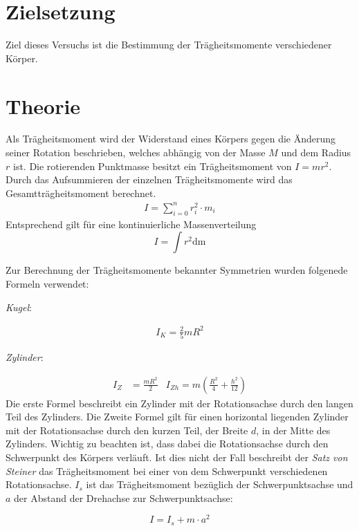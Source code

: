 \section{Zielsetzung}
Ziel dieses Versuchs ist die Bestimmung der Trägheitsmomente verschiedener Körper.
\section{Theorie}

Als Trägheitsmoment wird der Widerstand eines Körpers gegen die Änderung seiner Rotation beschrieben,
welches abhängig von der Masse $M$ und dem Radius $r$ ist.
Die rotierenden Punktmasse besitzt ein Trägheitsmoment von $I = mr^2$.
Durch das Aufsummieren der einzelnen Trägheitsmomente wird das Gesamtträgheitsmoment berechnet.
\begin{align}
 I= \sum_{i = 0}^n r_i^2\cdot m_i
 \end{align}
 Entsprechend gilt für eine kontinuierliche Massenverteilung
 \begin{equation}
   \label{eqn:Trägheitsmoment}
   I = \int r^2\mathup{dm}
 \end{equation}

Zur Berechnung der Trägheitsmomente bekannter Symmetrien wurden folgenede Formeln verwendet:

\emph{Kugel}:

\begin{align}
  I_K = \frac{2}{5}mR^2
  \label{eqn:3}
\end{align}

\emph{Zylinder}:

\begin{align}
I_{Z} &= \frac{mR^2}{2} &
   I_{Zh} = m(\frac{R^2}{4} + \frac{h^2}{12})
   \label{eqn:4}
\end{align}
Die erste Formel beschreibt ein Zylinder mit der Rotationsachse durch den langen Teil des Zylinders.
Die Zweite Formel gilt für einen horizontal liegenden Zylinder mit der Rotationsachse
durch den kurzen Teil, der Breite $d$, in der Mitte des Zylinders.
Wichtig zu beachten ist, dass dabei die Rotationsachse durch den Schwerpunkt
 des Körpers verläuft.
Ist dies nicht der Fall beschreibt der \textit{Satz von Steiner}
das Trägheitsmoment bei einer von dem Schwerpunkt verschiedenen Rotationsachse.
$I_s$ ist das Trägheitsmoment bezüglich der Schwerpunktsachse
und $a$ der Abstand der Drehachse zur Schwerpunktsachse:

\begin{equation}
  \label{eqn:Steiner}
  I = I_s +m\cdot a^2
\end{equation}

